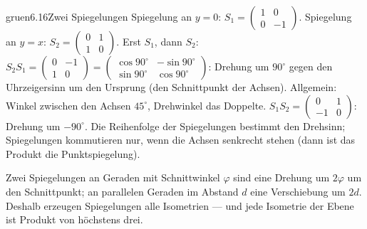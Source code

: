 \begin{loesungkarte}{gruen}{6.16}{Zwei Spiegelungen}
Spiegelung an $y = 0$: $S_1 = \begin{pmatrix}1 & 0\\ 0 & -1\end{pmatrix}$. Spiegelung an $y = x$: $S_2 = \begin{pmatrix}0 & 1\\ 1 & 0\end{pmatrix}$.
Erst $S_1$, dann $S_2$: $S_2S_1 = \begin{pmatrix}0 & -1\\ 1 & 0\end{pmatrix} = \begin{pmatrix}\cos90^{\circ} & -\sin90^{\circ}\\ \sin90^{\circ} & \cos90^{\circ}\end{pmatrix}$: Drehung um $90^{\circ}$ gegen den Uhrzeigersinn um den Ursprung (den Schnittpunkt der Achsen). Allgemein: Winkel zwischen den Achsen $45^{\circ}$, Drehwinkel das Doppelte.
$S_1S_2 = \begin{pmatrix}0 & 1\\ -1 & 0\end{pmatrix}$: Drehung um $-90^{\circ}$. Die Reihenfolge der Spiegelungen bestimmt den Drehsinn; Spiegelungen kommutieren nur, wenn die Achsen senkrecht stehen (dann ist das Produkt die Punktspiegelung).
\begin{mitnehmen}\kastentext
Zwei Spiegelungen an Geraden mit Schnittwinkel $\varphi$ sind eine Drehung um $2\varphi$ um den Schnittpunkt; an parallelen Geraden im Abstand $d$ eine Verschiebung um $2d$. Deshalb erzeugen Spiegelungen alle Isometrien --- und jede Isometrie der Ebene ist Produkt von höchstens drei.
\end{mitnehmen}
\end{loesungkarte}

